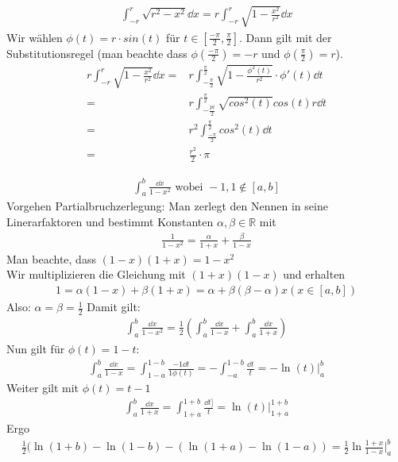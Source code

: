 \begin{Beispiel}{
	\begin{align*}
		\int_{-r}^r \sqrt{r^2 -x^2} \dd{x} = r \int_{-r}^r 
		\sqrt{1 - \frac{x^2}{r^2}} \dd{x}
	\end{align*}
	Wir wählen $\phi(t) = r \cdot sin(t)$ für $ t \in [\frac{-\pi}{2}, \frac{\pi}{2}]$. 
	Dann gilt mit der Substitutionsregel 
	(man beachte dass $\phi(\frac{-\pi}{2}) = -r 
	$ und $\phi(\frac{\pi}{2}) = r$). 
	\begin{align*}
		r \int_{-r}^r \sqrt{1 - \frac{x^2}{r^2}} \dd{x} = & r \int_{-\frac{\pi}{2}}
		^{\frac{\pi}{2}} \sqrt{1 - \frac{\phi^2(t)}{r^2}} \cdot \phi'(t) \dd{t} \\
		= & r \int_{-\frac{pi}{2}}^{\frac{\pi}{2}} \sqrt{cos^2(t)} cos(t) r\dd{t} \\
		= & r^2 \int_{\frac{-\pi}{2}}^{\frac{\pi}{2}} cos^2(t)\dd{t} \\
		= & \frac{r^2}{2} \cdot \pi
	\end{align*}	 
}\end{Beispiel} %

\begin{Beispiel}
	\begin{align*}
		\int_a^b \frac{\dd{x}}{1-x^2} \text{ wobei } -1, 1 \notin [a,b]
	\end{align*}
	Vorgehen Partialbruchzerlegung: Man zerlegt den Nennen in seine Linerarfaktoren 
	und bestimmt Konstanten $\alpha, \beta \in \mathbb{R}$ mit 
	\begin{align*}
		\frac{1}{1-x^2} = \frac{\alpha}{1+x} + \frac{\beta}{1-x}
	\end{align*}
	Man beachte, dass $(1-x)(1+x) = 1 -x^2$ \\
	Wir multiplizieren die Gleichung mit $(1+x)(1-x)$ und erhalten 
	\begin{align*}
		1 = \alpha (1 -x) + \beta (1+x) 
		= \alpha + \beta (\beta-\alpha)x (x \in [a,b])
	\end{align*}
	Also: $ \alpha = \beta = \frac{1}{2}$
	Damit gilt:
	\begin{align*}
		\int_a^b \frac{\dd{x}}{1-x^2} = \frac{1}{2} \left( \int_a^b \frac{\dd{x}}{1-x} + \int_a^b \frac{\dd{x}}{1+x} \right)
	\end{align*}
	Nun gilt für $\phi(t) = 1 - t$:
	\begin{align*}
		\int_a^b \frac{\dd{x}}{1-x} = \int_{1-a}^{1-b} \frac{-1 \dd{t}}{1 \phi(t)}
		= - \int_{-a}^{1-b} \frac{\dd{t}}{t} = -\ln(t)\vert_a^b
	\end{align*}
	Weiter gilt mit $\phi(t) = t-1$
	\begin{align*}
		\int_a^b \frac{\dd{x}}{1+x} = \int_{1+a}^{1+b} \frac{\dd{t]}}{t} = \ln(t) \vert_{1+a}^{1+b}
	\end{align*}
	Ergo
	\begin{align*}
		\frac{1}{2}(\ln(1+b) - \ln(1-b) - (\ln(1+a) - \ln(1-a))
		= \frac{1}{2} \ln \frac{1+x}{1-x}\vert_a^b
	\end{align*}	
\end{Beispiel}